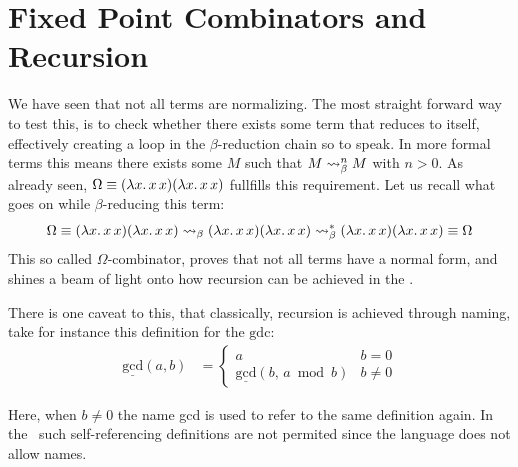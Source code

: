 \section{\centering Fixed Point Combinators and Recursion}
\label{sec:recursion-fixed-points}

We have seen that not all terms are normalizing. The most straight forward way to test this, is to check whether there exists some term that reduces to itself, effectively creating a loop in the $\beta$-reduction chain so to speak. In more formal terms this means there exists some $M$ such that \( M \mathrel{\leadsto}_\beta^n M \) with $ n > 0 $. As already seen, \( \Omega \equiv (\lambda x . \, x \, x) (\lambda x . \, x \, x) \) fullfills this requirement. Let us recall what goes on while $\beta$-reducing this term:
\[
  \Omega \equiv (\lambda x . \, x \, x) (\lambda x . \, x \, x) \mathrel{\leadsto}_\beta (\lambda x . \, x \, x) (\lambda x . \, x \, x) \mathrel{\leadsto}_\beta^* (\lambda x . \, x \, x) (\lambda x . \, x \, x) \equiv \Omega
\]
This so called $\Omega$-combinator, proves that not all terms have a normal form, and shines a beam of light onto how recursion can be achieved in the \lcalc.

There is one caveat to this, that classically, recursion is achieved through naming, take for instance this definition for the $\mathrm{gdc}$:
\begin{align*}
  \underline{\mathrm{gcd}}(a,b) &= 
                      \begin{cases}
                        a & b = 0 \\
                        \underline{\mathrm{gcd}}(b,\, a \bmod b) & b \neq 0
                      \end{cases}
\end{align*}

Here, when $b \neq 0$ the name gcd is used to refer to the same definition again. In the \lcalc \ such self-referencing definitions are not permited since the language does not allow names.

